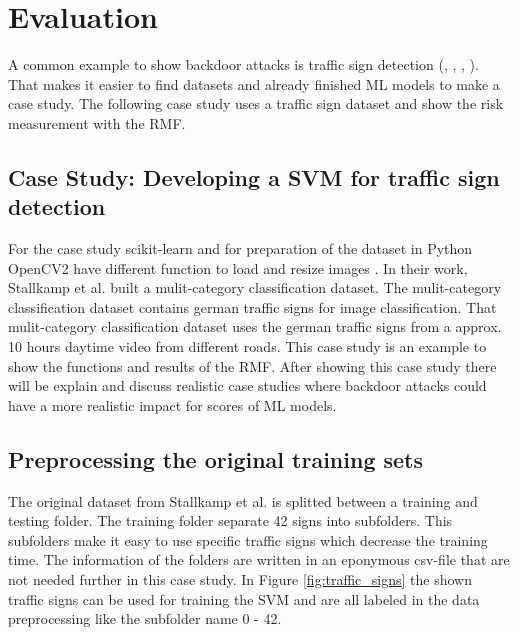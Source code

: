 \section{Evaluation}
\label{sec:evaluation}

A common example to show backdoor attacks is traffic sign detection (\cite{DBLP:journals/corr/abs-2102-10369}, \cite{DBLP:journals/corr/abs-1708-06733}, \cite{DBLP:conf/codaspy/NudingM20}, \cite{DBLP:journals/tdsc/LiXZZZ21}). That makes it easier to find datasets and already finished ML models to make a case study. The following case study uses a traffic sign dataset and show the risk measurement with the RMF.

\subsection{Case Study: Developing a SVM for traffic sign detection}

For the case study scikit-learn \cite{scikit-learn} and for preparation of the dataset in Python OpenCV2 have different function to load and resize images \cite{opencv_library}. In their work, Stallkamp et al. \cite{DBLP:conf/ijcnn/StallkampSSI11} built a mulit-category classification dataset. The mulit-category classification dataset contains german traffic signs for image classification. That mulit-category classification dataset uses the german traffic signs from a approx. 10 hours daytime video from different roads.
This case study is an example to show the functions and results of the RMF. After showing this case study there will be explain and discuss realistic case studies where backdoor attacks could have a more realistic impact for scores of ML models.

\subsection{Preprocessing the original training sets}

The original dataset from Stallkamp et al. is splitted between a training and testing folder. The training folder separate 42 signs into subfolders. This subfolders make it easy to use specific traffic signs which decrease the training time. The information of the folders are written in an eponymous csv-file that are not needed further in this case study. In Figure \ref{fig:traffic_signs} the shown traffic signs can be used for training the SVM and are all labeled in the data preprocessing like the subfolder name 0 - 42.

